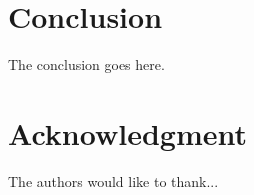 \documentclass[conference, letterpaper]{IEEEtran}
\begin{document}
%





\section{Conclusion}
The conclusion goes here.






\section*{Acknowledgment}


The authors would like to thank...





\end{document}
